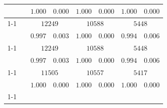 \begin{table}[h]
\begin{tabular}{|l|c|cccccc|}
                                                                                                                                                      &                                            & $1.000$              & \multicolumn{1}{c|}{$0.000$}              & $1.000$ & \multicolumn{1}{c|}{$0.000$} & $1.000$         & $0.000$        \\ \cline{1-1} \cline{3-8} 
        \multirow{2}{*}{$C_{Multi(cand, 2cand, 5)}$}                                                                                                  &                                            & \multicolumn{2}{c|}{$12249$}                                     & \multicolumn{2}{c|}{$10588$}           & \multicolumn{2}{c|}{$5448$}      \\
                                                                                                                                                      &                                            & $0.997$              & \multicolumn{1}{c|}{$0.003$}              & $1.000$ & \multicolumn{1}{c|}{$0.000$} & $0.994$         & $0.006$        \\ \cline{1-1} \cline{3-8} 
        \multirow{2}{*}{$C_{MWR(cand, 2cand, 5)}$}                                                                                                    &                                            & \multicolumn{2}{c|}{$12249$}                                     & \multicolumn{2}{c|}{$10588$}           & \multicolumn{2}{c|}{$5448$}      \\
                                                                                                                                                      &                                            & $0.997$              & \multicolumn{1}{c|}{$0.003$}              & $1.000$ & \multicolumn{1}{c|}{$0.000$} & $0.994$         & $0.006$        \\ \cline{1-1} \cline{3-8} 
        \multirow{2}{*}{$C_{Line(cand)}$}                                                                                                             &                                            & \multicolumn{2}{c|}{$11505$}                                     & \multicolumn{2}{c|}{$10557$}           & \multicolumn{2}{c|}{$5417$}      \\
                                                                                                                                                      &                                            & $1.000$              & \multicolumn{1}{c|}{$0.000$}              & $1.000$ & \multicolumn{1}{c|}{$0.000$} & $1.000$         & $0.000$        \\ \cline{1-1} \cline{3-8} 

\end{tabular}
\end{table}
